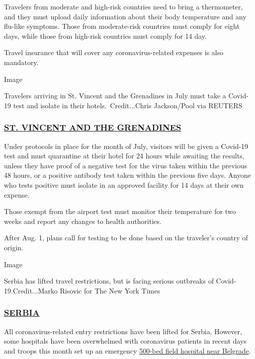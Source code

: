 Travelers from moderate and high-risk countries need to bring a
thermometer, and they must upload daily information about their body
temperature and any flu-like symptoms. Those from moderate-risk
countries must comply for eight days, while those from high-risk
countries must comply for 14 day.

Travel insurance that will cover any coronavirus-related expenses is
also mandatory.

Image

Travelers arriving in St. Vincent and the Grenadines in July must take a
Covid-19 test and isolate in their hotels.~Credit...Chris Jackson/Pool
via REUTERS

\hypertarget{st-vincent-and-the-grenadines}{%
\subsubsection{\texorpdfstring{\href{https://www.facebookcorewwwi.onion/svgairports/photos/pcb.934154330347186/934153757013910/}{ST.
VINCENT AND THE
GRENADINES}}{ST. VINCENT AND THE GRENADINES}}\label{st-vincent-and-the-grenadines}}

Under protocols in place for the month of July, visitors will be given a
Covid-19 test and must quarantine at their hotel for 24 hours while
awaiting the results, unless they have proof of a negative test for the
virus taken within the previous 48 hours, or a positive antibody test
taken within the previous five days. Anyone who tests positive must
isolate in an approved facility for 14 days at their own expense.

Those exempt from the airport test must monitor their temperature for
two weeks and report any changes to health authorities.

After Aug. 1, plans call for testing to be done based on the traveler's
country of origin.

Image

Serbia has lifted travel restrictions, but is facing serious outbreaks
of Covid-19.Credit...Marko Risovic for The New York Times

\hypertarget{serbia}{%
\subsubsection{\texorpdfstring{\href{https://rs.usembassy.gov/health-and-travel-alert-3/}{SERBIA}}{SERBIA}}\label{serbia}}

All coronavirus-related entry restrictions have been lifted for Serbia.
However, some hospitals have been overwhelmed with coronavirus patients
in recent days and troops this month set up an emergency
\href{https://www.republicworld.com/world-news/europe/serbia-military-sets-up-field-hospital-for-virus.html}{500-bed
field hospital near Belgrade}.

